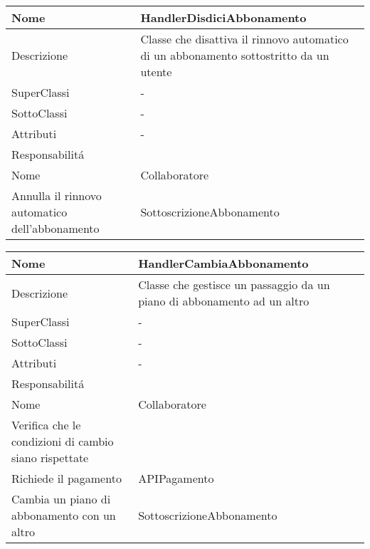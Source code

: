 \begin{center}
    \begin{longtable}{ |p{3cm}|p{3cm}|p{3cm}|p{3cm}| }
        \hline
        Nome & \multicolumn{3}{|p{9cm}|}{HandlerDisdiciAbbonamento} \\\hline
        Descrizione & \multicolumn{3}{|p{9cm}|}{Classe che disattiva il rinnovo automatico di un abbonamento sottostritto da un utente} \\\hline
        SuperClassi & \multicolumn{3}{|p{9cm}|}{-} \\\hline
        SottoClassi & \multicolumn{3}{|p{9cm}|}{-} \\\hline
        Attributi & \multicolumn{3}{|p{9cm}|}{-} \\\hline
        \multicolumn{4}{|p{12cm}|}{Responsabilit\'a} \\\hline
        \multicolumn{2}{|p{6cm}|}{Nome} & \multicolumn{2}{|p{6cm}|}{Collaboratore} \\\hline
        \multicolumn{2}{|p{6cm}|}{Annulla il rinnovo automatico dell'abbonamento} & \multicolumn{2}{|p{6cm}|}{SottoscrizioneAbbonamento} \\\hline
    \end{longtable}
\end{center}

\begin{center}
    \begin{longtable}{ |p{3cm}|p{3cm}|p{3cm}|p{3cm}| }
        \hline
        Nome & \multicolumn{3}{|p{9cm}|}{HandlerCambiaAbbonamento} \\\hline
        Descrizione & \multicolumn{3}{|p{9cm}|}{Classe che gestisce un passaggio da un piano di abbonamento ad un altro} \\\hline
        SuperClassi & \multicolumn{3}{|p{9cm}|}{-} \\\hline
        SottoClassi & \multicolumn{3}{|p{9cm}|}{-} \\\hline
        Attributi & \multicolumn{3}{|p{9cm}|}{-} \\\hline
        \multicolumn{4}{|p{12cm}|}{Responsabilit\'a} \\\hline
        \multicolumn{2}{|p{6cm}|}{Nome} & \multicolumn{2}{|p{6cm}|}{Collaboratore} \\\hline
        \multicolumn{2}{|p{6cm}|}{Verifica che le condizioni di cambio siano rispettate} & \multicolumn{2}{|p{6cm}|}{} \\\hline
        \multicolumn{2}{|p{6cm}|}{Richiede il pagamento} & \multicolumn{2}{|p{6cm}|}{APIPagamento} \\\hline
        \multicolumn{2}{|p{6cm}|}{Cambia un piano di abbonamento con un altro} & \multicolumn{2}{|p{6cm}|}{SottoscrizioneAbbonamento} \\\hline
    \end{longtable}
\end{center}

